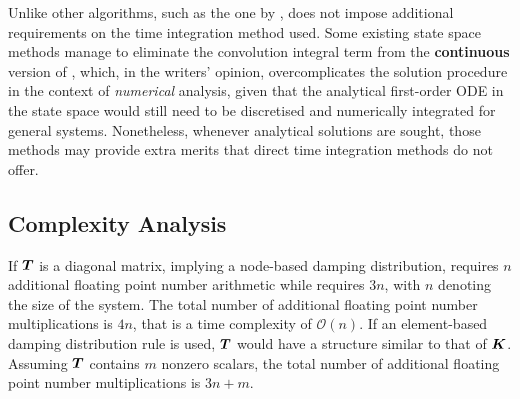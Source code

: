 Unlike other algorithms, such as the one by \citet{Cortes2009},  does not impose additional requirements on the time integration method used. Some existing state space methods manage to eliminate the convolution integral term from the \textbf{continuous} version of  \citep[see][]{Wagner2003,Wu2019}, which, in the writers' opinion, overcomplicates the solution procedure in the context of \textit{numerical} analysis, given that the analytical first-order ODE in the state space would still need to be discretised \citep{Adhikari2004} and numerically integrated for general systems. Nonetheless, whenever analytical solutions are sought, those methods may provide extra merits that direct time integration methods do not offer.
\subsection{Complexity Analysis}
If $\bm{T}$ is a diagonal matrix, implying a node-based damping distribution,  requires $n$ additional floating point number arithmetic while  requires $3n$, with $n$ denoting the size of the system. The total number of additional floating point number multiplications is $4n$, that is a time complexity of $\mathcal{O}\left(n\right)$. If an element-based damping distribution rule is used, $\bm{T}$ would have a structure similar to that of $\bm{K}$. Assuming $\bm{T}$ contains $m$ nonzero scalars, the total number of additional floating point number multiplications is $3n+m$.

